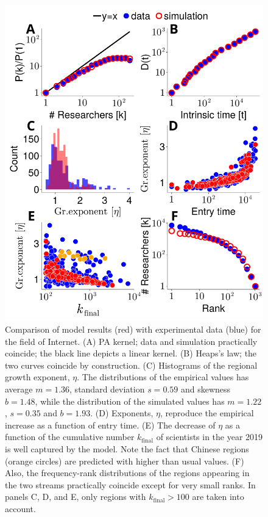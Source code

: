 \documentclass[draft,final]{vutinfth} %
\begin{document}
\begin{figure}[t]
    \centering
    \includegraphics[width=0.8\linewidth]{figures_csf/fig4-internet.pdf}
    \caption{Comparison of model results (red) with experimental data  (blue) for the field of Internet.
    (A) PA kernel; data and simulation practically coincide; the black line depicts a linear kernel.
    (B) Heaps's law; the two curves coincide by construction.
    (C) Histograms of the regional growth exponent, $\eta$. 
    The distributions of the empirical values has average $m=1.36$, standard deviation $s=0.59$ and skewness $b=1.48$, while the distribution of the simulated values has $m=1.22$, $s=0.35$ and $b=1.93$.
    (D) Exponents, $\eta$, reproduce the empirical increase as a function of entry time.
    (E) The decrease of $\eta$ as a function of the cumulative number $k_\mathrm{final}$ of scientists in the year 2019 is well captured by the model. Note the fact that Chinese regions (orange circles) are predicted with higher than usual values.
    (F) Also, the frequency-rank distributions of the regions appearing in the two streams practically coincide except for very small ranks.
    In panels C, D, and E, only regions with $k_\mathrm{final}>100$ are taken into account.
    }
    \label{fig:internet-model}
\end{figure}

\end{document}
